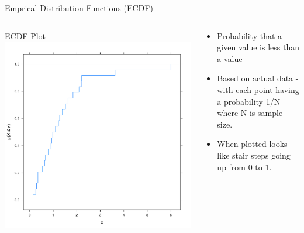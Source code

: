 \documentclass{beamer}
\begin{document}
\begin{frame}{Emprical Distribution Functions (ECDF)}
\begin{columns}    
	\begin{column}{4cm}        
		\begin{center}
		ECDF Plot           
	 	\includegraphics[width=1.0\textwidth]{Figure1}        
		\end{center}   
	 \end{column}    
	\begin{column}{5cm}        
	  
	\begin{itemize}
	\item Probability that a given value is less than a value
	\item Based on actual data - with each point having a probability 1/N where N is sample size.
	\item When plotted looks like stair steps going up from 0 to 1.
	\end{itemize}
	\end{column}
	\end{columns}

\end{frame}
\end{document}
